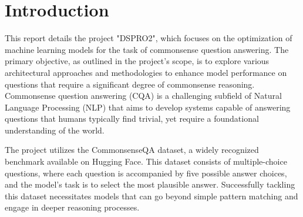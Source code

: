 \documentclass[10.5pt]{article}
\begin{document}
\newpage


\section{Introduction}
This report details the project "DSPRO2", which focuses on the optimization of machine learning models for the task of commonsense question answering. The primary objective, as outlined in the project's scope, is to explore various architectural approaches and methodologies to enhance model performance on questions that require a significant degree of commonsense reasoning. Commonsense question answering (CQA) is a challenging subfield of Natural Language Processing (NLP) that aims to develop systems capable of answering questions that humans typically find trivial, yet require a foundational understanding of the world.

The project utilizes the CommonsenseQA dataset, a widely recognized benchmark available on Hugging Face. This dataset consists of multiple-choice questions, where each question is accompanied by five possible answer choices, and the model's task is to select the most plausible answer. Successfully tackling this dataset necessitates models that can go beyond simple pattern matching and engage in deeper reasoning processes.
\end{document}
